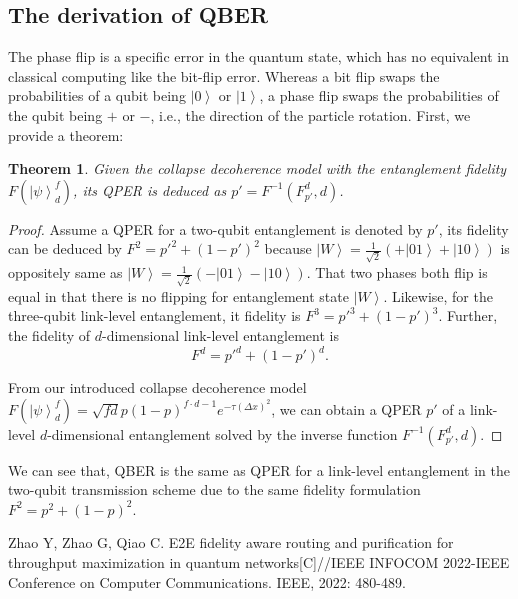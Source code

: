 \documentclass[conference]{IEEEtran}
\newtheorem{theorem}{Theorem}
\begin{document}
\begin{appendices}
\section{The derivation of QBER}
The phase flip is a specific error in the quantum state, which has no equivalent in classical computing like the bit-flip error. Whereas a bit flip swaps the probabilities of a qubit being $\left | 0 \right \rangle$ or $\left | 1 \right \rangle$, a phase flip swaps the probabilities of the qubit being $+$ or $-$, i.e., the direction of the particle rotation. First, we provide a theorem:
\begin{theorem}
\label{QPER}
Given the collapse decoherence model with the entanglement fidelity $F(\left| {{\psi}} \right\rangle _d^f) $, its QPER is deduced as $p' = F^{-1}(F^d_{p'}, d)$.
\end{theorem}
\begin{proof}
Assume a QPER for a two-qubit entanglement is denoted by $p'$, its fidelity can be deduced by $F^2=p'^2+(1-p')^2$ because $\left| W \right\rangle  = \frac{1}{{\sqrt 2 }}(+ \left| {01} \right\rangle  + \left| {10} \right\rangle )$ is oppositely same as $\left| W \right\rangle  = \frac{1}{{\sqrt 2 }}(- \left| {01} \right\rangle  - \left| {10} \right\rangle )$. That two phases both flip is equal in that there is no flipping for entanglement state $\left| W \right\rangle$. Likewise, for the three-qubit link-level entanglement, it fidelity is $F^3 = p'^3+(1-p')^3$. Further, the fidelity of $d$-dimensional link-level entanglement is 
\begin{equation}
	F^d = p'^d+(1-p')^d.
\end{equation}

From our introduced collapse decoherence model $F(\left| {{\psi}} \right\rangle _d^f) = \sqrt {fd} p{(1 - p)^{f \cdot d - 1}} {e^{ - \tau {{(\Delta x)}^2}}}$, we can obtain a QPER $p'$ of a link-level $d$-dimensional entanglement solved by the inverse function $F^{-1}(F^d_{p'}, d)$.
\end{proof}

We can see that, QBER is the same as QPER for a link-level entanglement in the two-qubit transmission scheme due to the same fidelity formulation $F^2=p^2+(1-p)^2$.

\end{appendices}
\begin{thebibliography}{99}
	 Zhao Y, Zhao G, Qiao C. E2E fidelity aware routing and purification for throughput maximization in quantum networks[C]//IEEE INFOCOM 2022-IEEE Conference on Computer Communications. IEEE, 2022: 480-489.
\end{thebibliography}
\end{document}
